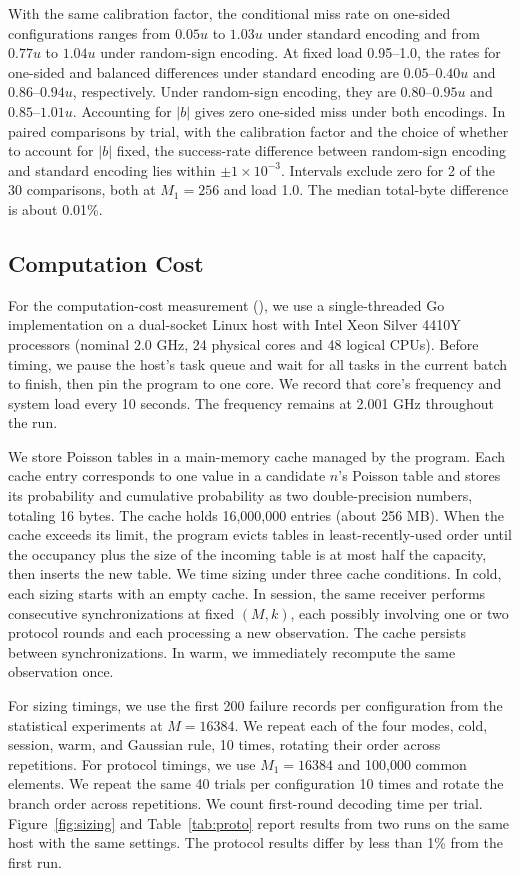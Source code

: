 With the same calibration factor, the conditional miss rate on one-sided configurations ranges from $0.05u$ to $1.03u$ under standard encoding and from $0.77u$ to $1.04u$ under random-sign encoding. At fixed load 0.95--1.0, the rates for one-sided and balanced differences under standard encoding are $0.05$--$0.40u$ and $0.86$--$0.94u$, respectively. Under random-sign encoding, they are $0.80$--$0.95u$ and $0.85$--$1.01u$. Accounting for $|b|$ gives zero one-sided miss under both encodings. In paired comparisons by trial, with the calibration factor and the choice of whether to account for $|b|$ fixed, the success-rate difference between random-sign encoding and standard encoding lies within $\pm1\times10^{-3}$. Intervals exclude zero for 2 of the 30 comparisons, both at $M_1=256$ and load 1.0. The median total-byte difference is about 0.01\%.

\subsection{Computation Cost}\label{app:timing}
For the computation-cost measurement (), we use a single-threaded Go implementation on a dual-socket Linux host with Intel Xeon Silver 4410Y processors (nominal 2.0 GHz, 24 physical cores and 48 logical CPUs). Before timing, we pause the host's task queue and wait for all tasks in the current batch to finish, then pin the program to one core. We record that core's frequency and system load every 10 seconds. The frequency remains at 2.001 GHz throughout the run.

We store Poisson tables in a main-memory cache managed by the program. Each cache entry corresponds to one value in a candidate $n$'s Poisson table and stores its probability and cumulative probability as two double-precision numbers, totaling 16 bytes. The cache holds 16,000,000 entries (about 256 MB). When the cache exceeds its limit, the program evicts tables in least-recently-used order until the occupancy plus the size of the incoming table is at most half the capacity, then inserts the new table. We time sizing under three cache conditions. In cold, each sizing starts with an empty cache. In session, the same receiver performs consecutive synchronizations at fixed $(M,k)$, each possibly involving one or two protocol rounds and each processing a new observation. The cache persists between synchronizations. In warm, we immediately recompute the same observation once.

For sizing timings, we use the first 200 failure records per configuration from the statistical experiments at $M=16384$. We repeat each of the four modes, cold, session, warm, and Gaussian rule, 10 times, rotating their order across repetitions. For protocol timings, we use $M_1=16384$ and 100,000 common elements. We repeat the same 40 trials per configuration 10 times and rotate the branch order across repetitions. We count first-round decoding time per trial. Figure~\ref{fig:sizing} and Table~\ref{tab:proto} report results from two runs on the same host with the same settings. The protocol results differ by less than 1\% from the first run.

